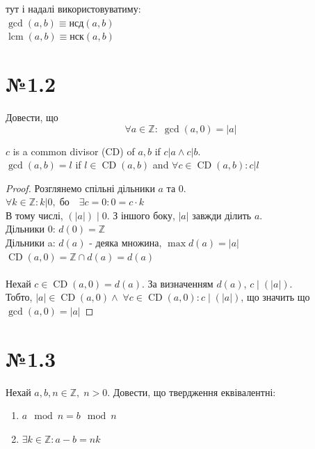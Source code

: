 \documentclass[11pt, a4paper]{article} %
\newcommand{\Z}{\mathbb{Z}}
\DeclareMathOperator{\lcm}{lcm}
\DeclareMathOperator{\cd}{CD}
\begin{document}
\begin{mdframed}[backgroundcolor=blue!10]
    тут і надалі використовуватиму:\\
    $\gcd(a,b) \equiv \text{нсд}(a,b)$\\ 
    $\lcm(a,b) \equiv \text{нск}(a,b)$
\end{mdframed}

\newpage
\section*{№1.2}
\begin{mdframed}
    Довести, що \[\forall a \in \Z:\; \gcd(a,0) = |a|\]
\end{mdframed}

\begin{mdframed}[backgroundcolor=blue!10]
    $c$ is a common divisor (CD) of $a,b$ if $c|a \land c|b$.\\
    $\gcd(a,b) = l$ if $l \in \cd(a,b)$ and $\forall c\in \cd(a,b): c|l$
\end{mdframed}


\begin{proof}
    Розглянемо спільні дільники $a$ та $0$.\\
    $\forall k \in \Z: k|0, \;\text{бо}\quad \exists c = 0: 0 = c\cdot k$\\
    В тому числі, $(|a|)\;|\;0$. З іншого боку, $|a|$ завжди ділить $a$.\\
    Дільники 0: $d(0) = \Z$\\
    Дільники a: $d(a)$ - деяка множина, $\max d(a) = |a|$\\
    $\cd(a,0) = \Z \cap d(a) = d(a)$ \\ 
    \\
    Нехай $c\in \cd(a,0) = d(a)$. За визначенням $d(a)$, $c\;|\;(|a|)$.\\
    Тобто, $|a| \in \cd(a,0) \land \; \forall c\in \cd(a,0): c\;|\;(|a|)$, 
    що значить що $\gcd(a,0) = |a|$
\end{proof}


\section*{№1.3}
\begin{mdframed}
    Нехай $a,b,n \in \Z, \; n>0$.
    Довести, що твердження еквівалентні:
    \begin{enumerate}
        \item $a \mod n = b \mod n$
        \item $\exists k\in\Z: a-b = nk$
    \end{enumerate}
\end{mdframed}
\end{document}
